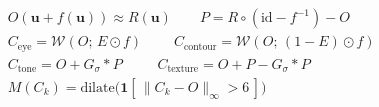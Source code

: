 \documentclass[border=6pt]{standalone}
\begin{document}
\Large
$\begin{aligned}
&O(\mathbf{u}+f(\mathbf{u}))\approx R(\mathbf{u}) \qquad P = R\circ(\mathrm{id}-f^{-1}) - O\\[6pt]
&C_\text{eye} = \mathcal{W}(O;\,E\odot f) \qquad\; C_\text{contour} = \mathcal{W}(O;\,(1-E)\odot f)\\[4pt]
&C_\text{tone} = O + G_\sigma * P \qquad\;\; C_\text{texture} = O + P - G_\sigma * P\\[6pt]
&M(C_k) = \mathrm{dilate}\big(\mathbf{1}[\,\|C_k-O\|_\infty>6\,]\big)
\end{aligned}$
\end{document}
